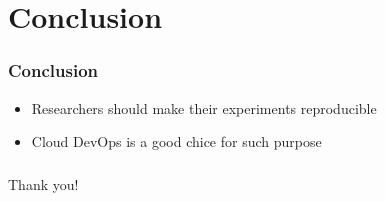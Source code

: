 \documentclass[notheorems]{beamer}
\begin{document}
\section{Conclusion}
\begin{frame}
\frametitle{Conclusion}
\begin{itemize}
\item Researchers should make their experiments reproducible
\item Cloud DevOps is a good chice for such purpose
\end{itemize}
\end{frame}

\begin{frame}
\frametitle{}
\begin{block}{}
\centering
{\Huge Thank you!}
\end{block}
\end{frame}
\end{document}
